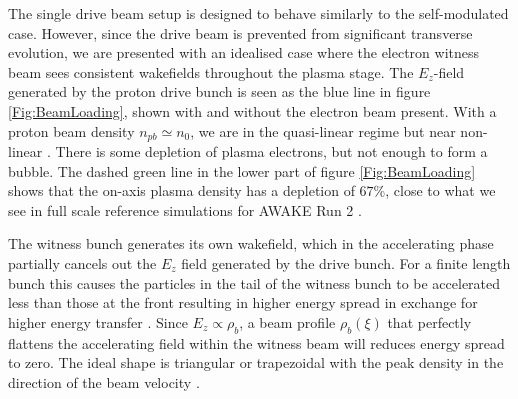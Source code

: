 \documentclass[aps,prstab,reprint,amsmath,amssymb,groupedaddress]{revtex4-1}
\begin{document}

The single drive beam setup is designed to behave similarly to the self-modulated case. However, since the drive beam is
prevented from significant transverse evolution, we are presented with an idealised case where the electron witness beam
sees consistent wakefields throughout the plasma stage. The $E_{z}$-field generated by the proton drive bunch is seen as
the blue line in figure \ref{Fig:BeamLoading}, shown with and without the electron beam present. With a proton beam
density $n_{pb} \simeq n_{0}$, we are in the quasi-linear regime but near non-linear \cite{rosenzweig:2010}. There is
some depletion of plasma electrons, but not enough to form a bubble. The dashed green line in the lower part of figure
\ref{Fig:BeamLoading} shows that the on-axis plasma density has a depletion of $67\%$, close to what we see in full
scale reference simulations for AWAKE Run 2 \cite{awake_collaboration:2016}.


The witness bunch generates its own wakefield, which in the accelerating phase partially cancels out the $E_{z}$ field
generated by the drive bunch. For a finite length bunch this causes the particles in the tail of the witness bunch to be
accelerated less than those at the front resulting in higher energy spread in exchange for higher energy transfer
\cite{van_der_meer:1985}. Since $E_{z} \propto \rho_{b}$, a beam profile $\rho_{b}(\xi)$ that perfectly flattens the
accelerating field within the witness beam will reduces energy spread to zero. The ideal shape is triangular or
trapezoidal with the peak density in the direction of the beam velocity \cite{katsouleas:1987, tzoufras:2009}.

\end{document}
